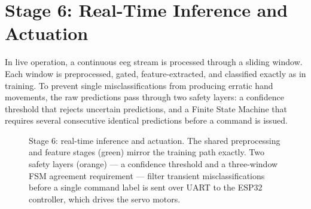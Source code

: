 \section{Stage 6: Real-Time Inference and Actuation}
\label{sec:mo_inference}

In live operation, a continuous \acrshort{eeg} stream is processed
through a sliding window. Each window is preprocessed, gated,
feature-extracted, and classified exactly as in training. To prevent
single misclassifications from producing erratic hand movements, the
raw predictions pass through two safety layers: a confidence
threshold that rejects uncertain predictions, and a Finite State
Machine that requires several consecutive identical predictions
before a command is issued.

\begin{figure}[htbp]
\centering
{}
\caption{Stage 6: real-time inference and actuation. The shared
preprocessing and feature stages (green) mirror the training path
exactly. Two safety layers (orange) --- a confidence threshold and a
three-window FSM agreement requirement --- filter transient
misclassifications before a single command label is sent over UART to
the ESP32 controller, which drives the servo motors.}
\label{fig:mo_inference}
\end{figure}

